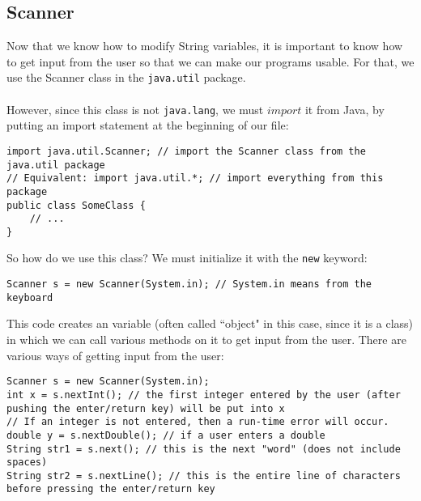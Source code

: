 \subsection{Scanner}
Now that we know how to modify String variables, it is important to know how to get input from the user so that we can make our programs usable. For that, we use the Scanner class in the \verb|java.util| package.
\\ \\
However, since this class is not \verb|java.lang|, we must $import$ it from Java, by putting an import statement at the beginning of our file:
\begin{lstlisting}
import java.util.Scanner; // import the Scanner class from the java.util package
// Equivalent: import java.util.*; // import everything from this package
public class SomeClass {
	// ...
}
\end{lstlisting}

\noindent So how do we use this class? We must initialize it with the \verb|new| keyword:
\begin{lstlisting}
Scanner s = new Scanner(System.in); // System.in means from the keyboard
\end{lstlisting}
\noindent This code creates an variable (often called ``object" in this case, since it is a class) in which we can call various methods on it to get input from the user. There are various ways of getting input from the user:

\begin{lstlisting}
Scanner s = new Scanner(System.in);
int x = s.nextInt(); // the first integer entered by the user (after pushing the enter/return key) will be put into x
// If an integer is not entered, then a run-time error will occur.
double y = s.nextDouble(); // if a user enters a double
String str1 = s.next(); // this is the next "word" (does not include spaces)
String str2 = s.nextLine(); // this is the entire line of characters before pressing the enter/return key
\end{lstlisting}


